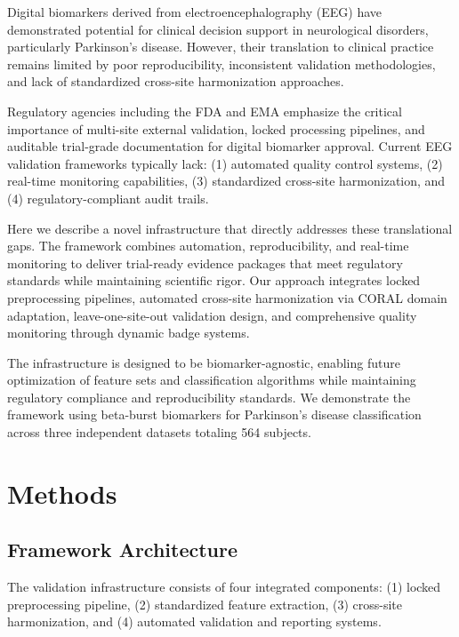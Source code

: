 \documentclass[11pt]{article}
\begin{document}
Digital biomarkers derived from electroencephalography (EEG) have demonstrated potential for clinical decision support in neurological disorders, particularly Parkinson's disease\cite{little2007exploiting,swann2016adaptive}. However, their translation to clinical practice remains limited by poor reproducibility, inconsistent validation methodologies, and lack of standardized cross-site harmonization approaches\cite{thompson2020systematic,varoquaux2017cross}.

Regulatory agencies including the FDA and EMA emphasize the critical importance of multi-site external validation, locked processing pipelines, and auditable trial-grade documentation for digital biomarker approval\cite{fda2022digital,ema2020qualification}. Current EEG validation frameworks typically lack: (1) automated quality control systems, (2) real-time monitoring capabilities, (3) standardized cross-site harmonization, and (4) regulatory-compliant audit trails\cite{bigdely2016toward,cohen2022clinical}.

Here we describe a novel infrastructure that directly addresses these translational gaps. The framework combines automation, reproducibility, and real-time monitoring to deliver trial-ready evidence packages that meet regulatory standards while maintaining scientific rigor. Our approach integrates locked preprocessing pipelines, automated cross-site harmonization via CORAL domain adaptation, leave-one-site-out validation design, and comprehensive quality monitoring through dynamic badge systems.

The infrastructure is designed to be biomarker-agnostic, enabling future optimization of feature sets and classification algorithms while maintaining regulatory compliance and reproducibility standards. We demonstrate the framework using beta-burst biomarkers for Parkinson's disease classification across three independent datasets totaling 564 subjects.

\section{Methods}

\subsection{Framework Architecture}

The validation infrastructure consists of four integrated components: (1) locked preprocessing pipeline, (2) standardized feature extraction, (3) cross-site harmonization, and (4) automated validation and reporting systems.
\end{document}
